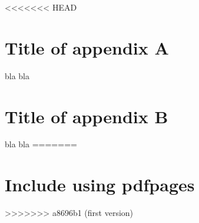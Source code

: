 <<<<<<< HEAD
\chapter{Title of appendix A}

bla bla

\chapter{Title of appendix B}

bla bla
=======
\chapter{Include using pdfpages}



>>>>>>> a8696b1 (first version)
